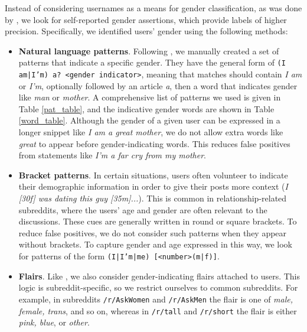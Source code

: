 Instead of considering usernames as a means for gender classification, as was done by \citet{thelwall2018she}, we look for self-reported gender assertions, which provide labels of higher precision.
Specifically, we identified 
users' gender
using the following methods:
\begin{itemize}
    \item \textbf{Natural language patterns}.
    Following \citet{fabian2015privacy}, we manually created a set of patterns that indicate a specific gender. They have the general form of \texttt{\small (I am|I'm) a? <gender indicator>}, meaning that matches should contain \textit{I am} or \textit{I'm}, optionally followed by an article \textit{a}, then a word that indicates gender like \textit{man} or \textit{mother}. A comprehensive list of patterns we used is given in Table \ref{pat_table}, and the indicative gender words are shown in Table \ref{word_table}. Although the gender of a given user can be expressed in a longer snippet like \textit{I am a great mother}, we do not allow extra words like \textit{great} to appear before gender-indicating words. This reduces false positives from statements like \textit{I'm a far cry from my mother}.
    
    \item \textbf{Bracket patterns}.
    In certain situations, users often volunteer to indicate their demographic information in order to give their posts more context (\textit{I [30f] was dating this guy [35m]...}).
    This is common in relationship-related subreddits, where the users' age and gender are often relevant to the discussions. These cues are generally written in round or square brackets. To reduce false positives, we do not consider such patterns when they appear without brackets. To capture gender and age expressed in this way, we look for patterns of the form \texttt{\small (I|I'm|me) [<number>(m|f)]}.
    
    \item \textbf{Flairs}.
    Like \citet{Vasilev2018}, we also consider gender-indicating flairs attached to users.
    This logic is subreddit-specific, so we restrict ourselves to common subreddits.
    For example, in subreddits \texttt{\small /r/AskWomen} and \texttt{\small /r/AskMen} the flair is one of \textit{male, female, trans}, and so on, whereas in \texttt{\small /r/tall} and \texttt{\small /r/short} the flair is either \textit{pink, blue}, or \textit{other}.

\end{itemize}


